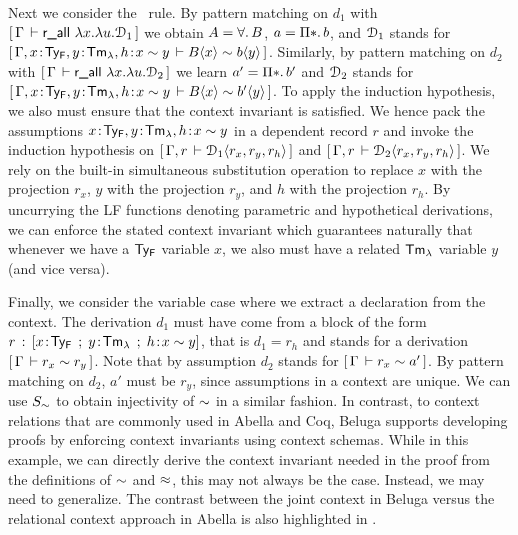 Next we consider the \rall~rule. By pattern matching on $d_1$ with $[\,\Gamma\,\vdash \textsf{r\_all}~\lambda x.\lambda u.\mathcal{D}_1\,]$ we obtain $A = \forall.\, B$, $a = \Prod{\Prp} b$,
and $\mathcal{D}_1$ stands for $[\,\Gamma, x \!:\! \mathsf{Ty_{F}}, y \!:\! \mathsf{Tm_{\lambda}}, h \!:\! x \mathrel{\sim} y\,\vdash B\langle x\rangle \mathrel{\sim} b\langle y\rangle\,]$.
Similarly, by pattern matching on $d_2$ with $[\,\Gamma\,\vdash \textsf{r\_all}~\lambda x.\lambda u.\mathcal{D}_2\,]$ we learn $a' = \Prod{\Prp} b'$ and $\mathcal{D}_2$ stands for
$[\,\Gamma, x \!:\! \mathsf{Ty_{F}}, y \!:\! \mathsf{Tm_{\lambda}}, h \!:\! x \mathrel{\sim} y\,\vdash B\langle x\rangle \mathrel{\sim} b'\langle y\rangle\,]$.
%
To apply the induction hypothesis, we also must ensure that the context invariant is satisfied. We hence pack the assumptions $ x \!:\! \mathsf{Ty_{F}}, y \!:\! \mathsf{Tm_{\lambda}}, h \!:\! x \mathrel{\sim} y$ in a dependent record $r$ and
invoke the induction hypothesis on $[\,\Gamma, r\,\vdash \mathcal{D}_1\langle r_x,r_y,r_h\rangle\,]$ and $[\,\Gamma, r\,\vdash \mathcal{D}_2\langle r_x,r_y,r_h\rangle\,]$. We rely on the built-in simultaneous substitution operation to replace $x$ with the projection $r_x$, $y$ with the projection $r_y$, and $h$ with the projection $r_h$. By uncurrying the LF functions denoting parametric and hypothetical derivations, we can enforce the stated context invariant which guarantees naturally that whenever we have a $\mathsf{Ty_{F}}$ variable $x$, we also must have a related  $\mathsf{Tm_{\lambda}}$ variable $y$ (and vice versa).



Finally, we consider the variable case where we extract a declaration from the context. The derivation $d_1$ must have come from a block of the form $r \mathrel{\, : \,} [x\!:\!\mathsf{Ty_{F}} \mathrel{\, ; \,} y\!:\!\mathsf{Tm_{\lambda}} \mathrel{\, ; \,} h \!:\! x \mathrel{\sim} y]$, that is $d_1 = r_h$ and stands for a derivation
$[\,\Gamma\,\vdash r_x \mathrel{\sim} r_y\,]$. Note that by assumption $d_2$ stands for $[\,\Gamma\,\vdash r_x \mathrel{\sim} a'\,]$.  By pattern matching on $d_2$, $a'$ must be $r_y$, since assumptions in a context are unique.
We can use $S_{\mathrel{\sim}}$ to obtain injectivity of $\mathrel{\sim}$ in a similar fashion.
%
In contrast, to context relations that are commonly used in Abella and Coq, Beluga supports developing proofs by enforcing context invariants using context schemas. While in this example, we can directly derive the context invariant needed in the proof from the definitions of $\mathrel{\sim}$ and $\mathrel{\approx}$, this may not always be the case.  Instead, we may need to generalize. The contrast between the joint context in Beluga versus the relational context approach in Abella is also highlighted in \cite{Felty:ITP10,Felty:orbi-survey}.


